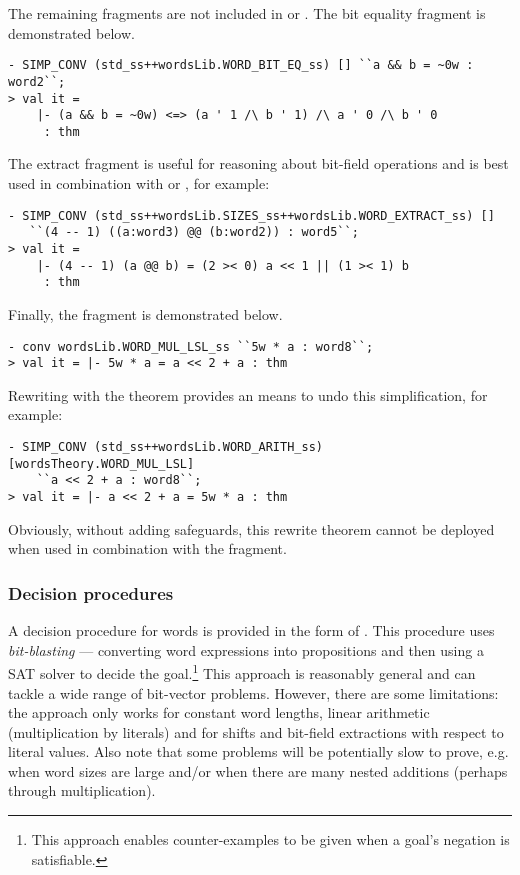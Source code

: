 The remaining fragments are not included in  or .  The bit equality fragment is demonstrated below.
\begin{session}
\begin{verbatim}
- SIMP_CONV (std_ss++wordsLib.WORD_BIT_EQ_ss) [] ``a && b = ~0w : word2``;
> val it =
    |- (a && b = ~0w) <=> (a ' 1 /\ b ' 1) /\ a ' 0 /\ b ' 0
     : thm
\end{verbatim}
\end{session}
The extract fragment is useful for reasoning about bit-field operations and is best used in combination with  or , for example:
\begin{session}
\begin{verbatim}
- SIMP_CONV (std_ss++wordsLib.SIZES_ss++wordsLib.WORD_EXTRACT_ss) []
   ``(4 -- 1) ((a:word3) @@ (b:word2)) : word5``;
> val it =
    |- (4 -- 1) (a @@ b) = (2 >< 0) a << 1 || (1 >< 1) b
     : thm
\end{verbatim}
\end{session}
Finally, the fragment  is demonstrated below.
\begin{session}
\begin{verbatim}
- conv wordsLib.WORD_MUL_LSL_ss ``5w * a : word8``;
> val it = |- 5w * a = a << 2 + a : thm
\end{verbatim}
\end{session}
Rewriting with the theorem  provides an means to undo this simplification, for example:
\begin{session}
\begin{verbatim}
- SIMP_CONV (std_ss++wordsLib.WORD_ARITH_ss) [wordsTheory.WORD_MUL_LSL]
    ``a << 2 + a : word8``;
> val it = |- a << 2 + a = 5w * a : thm
\end{verbatim}
\end{session}
Obviously, without adding safeguards, this rewrite theorem cannot be deployed when used in combination with the  fragment.

\subsubsection{Decision procedures}

A decision procedure for words is provided in the form of
.  This procedure uses \emph{bit-blasting} ---
converting word expressions into propositions and then using a SAT solver to
decide the goal.\footnote{This approach enables counter-examples to be given
when a goal's negation is satisfiable.} This approach is reasonably general and
can tackle a wide range of bit-vector problems.  However, there are some
limitations: the approach only works for constant word lengths, linear
arithmetic (multiplication by literals) and for shifts and bit-field
extractions with respect to literal values.  Also note that some problems will
be potentially slow to prove, e.g.{} when word sizes are large and/or when
there are many nested additions (perhaps through multiplication).

